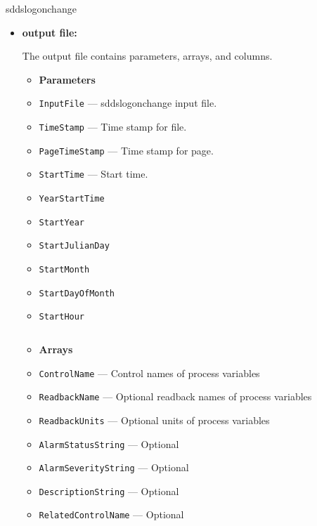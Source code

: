 \begin{sddsprog}{sddslogonchange}
\begin{itemize}
  \item \textbf{output file:}\par
The output file contains parameters, arrays, and columns.
  \begin{itemize}
    \item {\bf Parameters}
    \item {\tt InputFile} --- sddslogonchange input file.
    \item {\tt TimeStamp} --- Time stamp for file.
    \item {\tt PageTimeStamp} --- Time stamp for page.
    \item {\tt StartTime} --- Start time.
    \item {\tt YearStartTime}
    \item {\tt StartYear}
    \item {\tt StartJulianDay}
    \item {\tt StartMonth}
    \item {\tt StartDayOfMonth}
    \item {\tt StartHour}
  \end{itemize}
\begin{verbatim}

\end{verbatim}
  \begin{itemize}
    \item {\bf Arrays}
    \item {\tt ControlName} --- Control names of process variables
    \item {\tt ReadbackName} --- Optional readback names of process variables
    \item {\tt ReadbackUnits} --- Optional units of process variables
    \item {\tt AlarmStatusString} --- Optional
    \item {\tt AlarmSeverityString} --- Optional
    \item {\tt DescriptionString} --- Optional
    \item {\tt RelatedControlName} --- Optional
  \end{itemize}
\begin{verbatim}


\end{verbatim}
\end{itemize}
\end{sddsprog}
